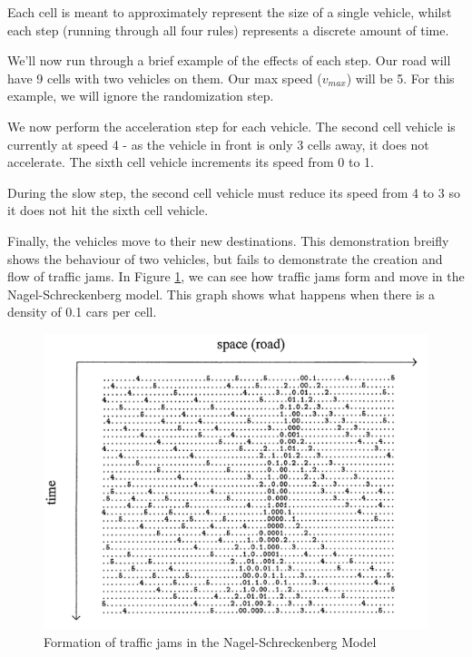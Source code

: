 \documentclass[ %
                    author={Alexander Hill},
                supervisor={Dr. Benjamin Sach},
                    degree={MEng},
                     title={MARMOSET: Multi Agent Real-time Multi-core Online
                     Simulation for Efficient Transportation},
                  subtitle={},
                      type={research},
                      year={2016} ]{dissertation}
\begin{document}
Each cell is meant to approximately represent the size of a single vehicle,
whilst each step (running through all four rules) represents a discrete amount
of time.

We'll now run through a brief example of the effects of each step. Our road will
have 9 cells with two vehicles on them. Our max speed ($v_{max}$) will be 5.
For this example, we will ignore the randomization step.

\begin{figure}[!h]
\centering
{}
\end{figure}

We now perform the acceleration step for each vehicle. The second cell vehicle is
currently at speed 4 - as the vehicle in front is only 3 cells away, it does not
accelerate. The sixth cell vehicle increments its speed from 0 to 1.

During the slow step, the second cell vehicle must reduce its speed from 4 to 3
so it does not hit the sixth cell vehicle.

\begin{figure}[!h]
\centering
{}
\end{figure}

Finally, the vehicles move to their new destinations. This demonstration breifly
shows the behaviour of two vehicles, but fails to demonstrate the creation and
flow of traffic jams. In Figure \ref{nagel-demo}, we can see how traffic jams
form and move in the Nagel-Schreckenberg model. This graph shows what happens
when there is a density of 0.1 cars per cell.

\begin{figure}[h]
    \centering
    \includegraphics[scale=0.4]{nagel}
    \caption{Formation of traffic jams in the Nagel-Schreckenberg Model}\label{nagel-demo}
\end{figure}
\end{document}
